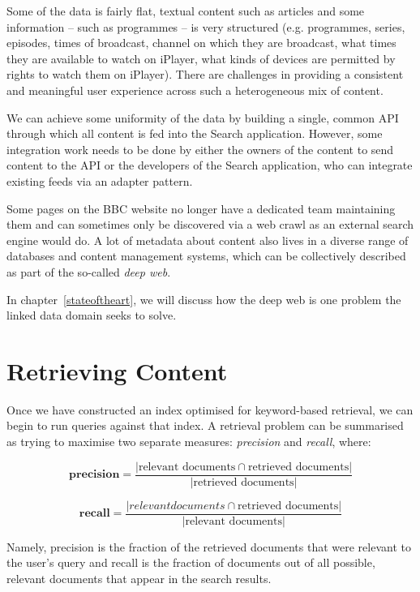 Some of the data is fairly flat, textual content such as articles and some
information -- such as programmes -- is very structured (e.g. programmes,
series, episodes, times of broadcast, channel on which they are broadcast,
what times they are available to watch on iPlayer, what kinds of devices
are permitted by rights to watch them on iPlayer). There are challenges
in providing a consistent and meaningful user experience across such
a heterogeneous mix of content.

We can achieve some uniformity of the data by building a single, common
API through which all content is fed into the Search application. However,
some integration work needs to be
done by either the owners of the content to send content to the API
or the developers of the Search application, who can integrate
existing feeds via an adapter pattern.

Some pages on the BBC website no
longer have a dedicated team maintaining them and can sometimes only
be discovered via a web crawl as an external search engine would do. A lot
of metadata about content also lives in a diverse range of databases and
content management systems, which can be collectively described as part
of the so-called \emph{deep web}.\cite{}

In chapter~\ref{stateoftheart}, we will discuss how the deep web is one
problem the linked data domain seeks to solve.

\section{Retrieving Content}

Once we have constructed an index optimised for keyword-based retrieval,
we can begin to run queries against that index. A retrieval problem
can be summarised as trying to maximise two separate measures: \emph{precision}
and \emph{recall}, where:

\begin{displaymath}
  \textbf{precision} = \frac{
    |\text{relevant documents} \cap \text{retrieved documents}|
  }{
    |\text{retrieved documents}|
  }
\end{displaymath}

\begin{displaymath}
  \textbf{recall} = \frac{
    |{relevant documents} \cap \text{retrieved documents}|
  }{
    |\text{relevant documents}|
  }
\end{displaymath}

Namely, precision is the fraction of the retrieved documents that were
relevant to the user's query and recall is the fraction of documents out of
all possible, relevant documents that appear in the search results.

